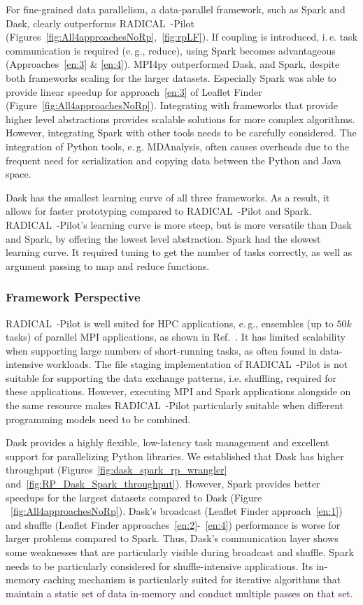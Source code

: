 For fine-grained data parallelism, a data-parallel framework, such as Spark and Dask, clearly outperforms RADICAL~-Pilot (Figures~\ref{fig:All4approachesNoRp},~\ref{fig:rpLF}).
If coupling is introduced, i.\,e. task communication is required (e.\,g., reduce), using Spark becomes advantageous (Approaches~\ref{en:3} \& \ref{en:4}). 
MPI4py outperformed Dask, and Spark, despite both frameworks scaling for the larger datasets.
Especially Spark was able to provide linear speedup for approach~\ref{en:3} of Leaflet Finder (Figure~\ref{fig:All4approachesNoRp}).
Integrating with frameworks that provide higher level abstractions provides scalable solutions for more complex algorithms.
However, integrating Spark with other tools needs to be carefully considered.
The integration of Python tools, e.\,g. MDAnalysis, often causes overheads due to the frequent need for serialization and copying data between the Python and Java space.

Dask has the smallest learning curve of all three frameworks.
As a result, it allows for faster prototyping compared to RADICAL~-Pilot and Spark.
RADICAL~-Pilot's learning curve is more steep, but is more versatile than Dask and Spark, by offering the lowest level abstraction. 
Spark had the slowest learning curve.
It required tuning to get the number of tasks correctly, as well as argument passing to map and reduce functions.

\subsubsection*{Framework Perspective}
RADICAL~-Pilot is well suited for HPC applications, e.\,g., ensembles (up to $50k$ tasks) of parallel MPI applications, as shown in Ref.~\cite{merzky2018design,merzky2019using}.
It has limited scalability when supporting large numbers of short-running tasks, as often found in data-intensive workloads.
The file staging implementation of RADICAL~-Pilot is not suitable for supporting the data exchange patterns, i.e. shuffling, required for these applications.
However, executing MPI and Spark applications alongside on the same resource makes RADICAL~-Pilot particularly suitable when different programming models need to be combined.

Dask provides a highly flexible, low-latency task management and excellent support for parallelizing Python libraries.
We established that Dask has higher throughput (Figures~\ref{fig:dask_spark_rp_wrangler} and~\ref{fig:RP_Dask_Spark_throughput}).
However, Spark provides better speedups for the largest datasets compared to Dask (Figure ~\ref{fig:All4approachesNoRp}).
Dask's broadcast (Leaflet Finder approach~\ref{en:1}) and shuffle (Leaflet Finder approaches~\ref{en:2}-~\ref{en:4}) performance is worse for larger problems compared to Spark.
Thus, Dask's communication layer shows some weaknesses that are particularly visible during broadcast and shuffle.
Spark needs to be particularly considered for shuffle-intensive applications.
Its in-memory caching mechanism is particularly suited for iterative algorithms that maintain a static set of data in-memory and conduct multiple passes on that set.

